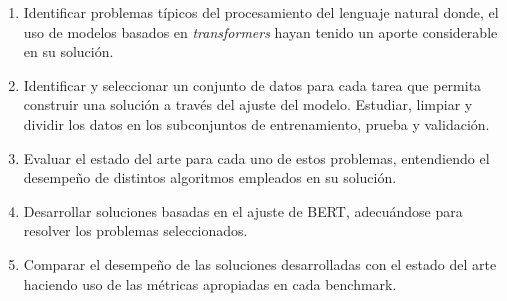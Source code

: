 \begin{enumerate}[label=\destacado{\arabic*.}]
  \setlength\itemsep{1em}
  \item Identificar problemas típicos del procesamiento del lenguaje natural donde, el uso de modelos basados en \textit{transformers} hayan tenido un aporte considerable en su solución.

  \item Identificar y seleccionar un conjunto de datos para cada tarea que permita construir una solución a través del ajuste del modelo. Estudiar, limpiar y dividir los datos en los subconjuntos de entrenamiento, prueba y validación.

  \item Evaluar el estado del arte para cada uno de estos problemas, entendiendo el desempeño de distintos algoritmos empleados en su solución.
  
  \item Desarrollar soluciones basadas en el ajuste de BERT, adecuándose para resolver los problemas seleccionados.
  
  \item Comparar el desempeño de las soluciones desarrolladas con el estado del arte haciendo uso de las métricas apropiadas en cada benchmark.
\end{enumerate}